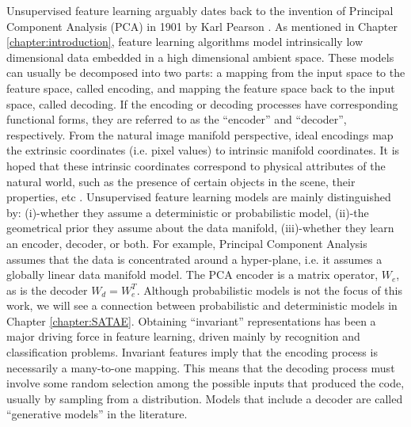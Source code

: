 Unsupervised feature learning arguably dates back to the invention of Principal
Component Analysis (PCA) in 1901 by Karl Pearson \cite{PCA}. As mentioned in
Chapter \ref{chapter:introduction}, feature learning algorithms model
intrinsically low dimensional data embedded in a high dimensional ambient
space. These models can usually be decomposed into two parts: a mapping from
the input space to the feature space, called encoding, and mapping the feature
space back to the input space, called decoding. If the encoding or decoding
processes have corresponding functional forms, they are referred to as the
``encoder'' and ``decoder'', respectively.  From the natural image manifold
perspective, ideal encodings map the extrinsic coordinates (i.e. pixel values)
to intrinsic manifold coordinates. It is hoped that these intrinsic coordinates
correspond to physical attributes of the natural world, such as the presence of
certain objects in the scene, their properties, etc \cite{nair2008,capsules}.
Unsupervised feature learning models are mainly distinguished by: (i)-whether
they assume a deterministic or probabilistic model, (ii)-the geometrical prior
they assume about the data manifold, (iii)-whether they learn an encoder,
decoder, or both. For example, Principal Component Analysis assumes that the
data is concentrated around a hyper-plane, i.e. it assumes a globally linear
data manifold model. The PCA encoder is a matrix operator, $W_e$, as is the
decoder $W_d=W_e^T$. Although probabilistic models is not the focus of this
work, we will see a connection between probabilistic and deterministic models
in Chapter \ref{chapter:SATAE}.  Obtaining ``invariant'' representations has
been a major driving force in feature learning, driven mainly by recognition
and classification problems.  Invariant features imply that the encoding
process is necessarily a many-to-one mapping. This means that the decoding
process must involve some random selection among the possible inputs that
produced the code, usually  by sampling from a distribution. Models that
include a decoder are called ``generative models'' in the literature. 

